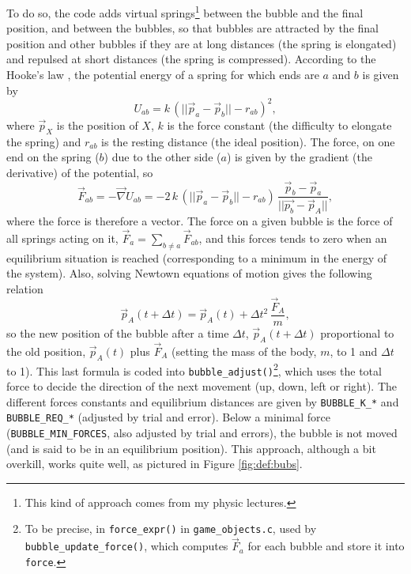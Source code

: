 \documentclass[12pt,a4paper]{article}
\newcommand{\cc}[1]{\texttt{#1}}
\begin{document}
To do so, the code adds virtual springs\footnote{This kind of approach comes from my physic lectures.} between the bubble and the final position, and between the bubbles, so that bubbles are attracted by the final position and other bubbles if they are at long distances (the spring is elongated) and repulsed at short distances (the spring is compressed). According to the Hooke's law \cite{hooke}, the potential energy of a spring for which ends are $a$ and $b$ is given by\begin{equation}
U_{ab} = k\,(||\vec{p}_a-\vec{p}_b||-r_{ab})^2,
\end{equation}
where $\vec{p}_X$ is the position of $X$, $k$ is the force constant (the difficulty to elongate the spring) and $r_{ab}$ is the resting distance (the ideal position). The force, on one end on the spring ($b$) due to the other side ($a$) is given by the gradient (the derivative) of the potential, so\begin{equation}
\vec{F}_{ab}  = - \vec{\nabla} U_{ab} =  -2\,k\,(||\vec{p}_a-\vec{p}_b||-r_{ab})\,\frac{\vec{p}_b-\vec{p}_a}{||\vec{p_b}-\vec{p}_A||},
\end{equation}
where the force is therefore a vector. The force on a given bubble is the force of all springs acting on it, $\vec{F}_a = \sum_{b\neq a} \vec{F}_{ab}$, and this forces tends to zero when an equilibrium situation is reached (corresponding to a minimum in the energy of the system). Also, solving Newtown equations of motion gives the following relation\begin{equation}
\vec{p}_A(t+\Delta{t}) = \vec{p}_A(t) + \Delta{t}^2\,\frac{\vec{F}_A}{m},\label{eq:1}
\end{equation}
so the new position of the bubble after a time $\Delta{t}$, $\vec{p}_A(t+\Delta{t})$ proportional to the old position, $\vec{p}_A(t)$ plus $\vec{F}_A$ (setting the mass of the body, $m$, to 1 and $\Delta{t}$ to 1). This last formula is coded into \cc{bubble_adjust()}\footnote{To be precise, in \cc{force_expr()} in \texttt{game\_objects.c}, used by \cc{bubble_update_force()}, which computes $\vec{F}_{a}$ for each bubble and store it into \cc{force}.}, which uses the total force to decide the direction of the next movement (up, down, left or right). The different forces constants and equilibrium distances are given by \cc{BUBBLE_K_*} and \cc{BUBBLE_REQ_*} (adjusted by trial and error). Below a minimal force (\cc{BUBBLE_MIN_FORCES}, also adjusted by trial and errors), the bubble is not moved (and is said to be in an equilibrium position). This approach, although a bit overkill, works quite well, as pictured in Figure \ref{fig:def:bubs}.
\end{document}
